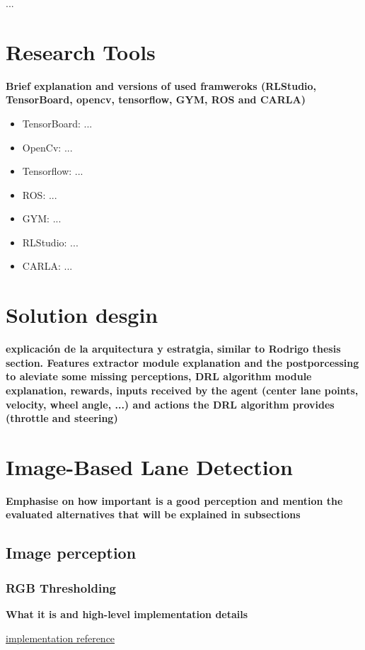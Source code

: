 \documentclass[conference]{IEEEtran}
\begin{document}
...

\section{Research Tools}

\textbf{Brief explanation and versions of used framweroks (RLStudio, TensorBoard, opencv, tensorflow, GYM, ROS and CARLA)}
\begin{itemize}
    \item TensorBoard: ...
    \item OpenCv: ...
    \item Tensorflow: ...
    \item ROS: ...
    \item GYM: ...
    \item RLStudio: ...
    \item CARLA: ...
\end{itemize}

\section{Solution desgin}
\textbf{ explicación de la arquitectura y estratgia, similar to Rodrigo thesis section. Features extractor module explanation and the postporcessing to aleviate some missing perceptions, DRL algorithm module explanation, rewards, inputs received by the agent (center lane points, velocity, wheel angle, ...) and actions the DRL algorithm provides (throttle and steering) }

\section{Image-Based Lane Detection}
\textbf{Emphasise on how important is a good perception and mention the evaluated alternatives that will be explained in subsections}

\subsection{Image perception}

\subsubsection{RGB Thresholding}
\textbf{What it is and high-level implementation details}

\href{https://tjosh.medium.com/finding-lane-lines-with-colour-thresholds-beb542e0d839}{implementation reference}
\end{document}
